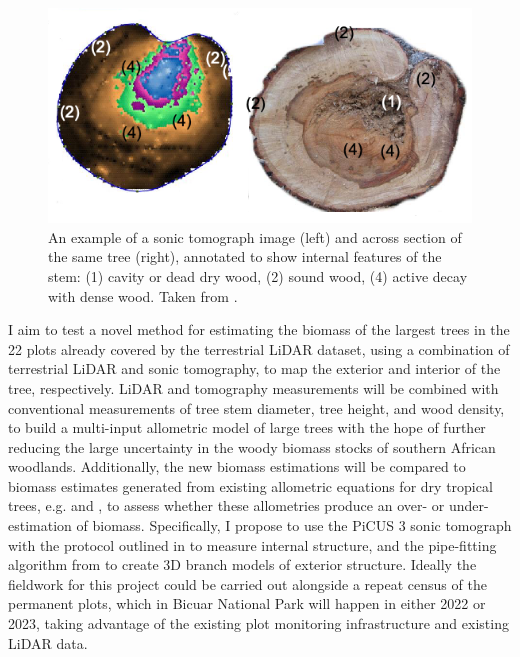 \begin{refsection}
\begin{figure}[!h]
\centering
	\includegraphics[width=\textwidth]{img/tomograph}
	\caption[Example tomograph visualisation and trunk cross-section photograph]{An example of a sonic tomograph image (left) and across section of
		the same tree (right), annotated to show internal features of the stem:
		(1) cavity or dead dry wood, (2) sound wood, (4) active decay with dense
	wood. Taken from \citet{Picus2016}.}
	\label{legacy:tomograph}
\end{figure}

I aim to test a novel method for estimating the biomass of the largest trees in the 22 plots already covered by the terrestrial LiDAR dataset, using a combination of terrestrial LiDAR and sonic tomography, to map the exterior and interior of the tree, respectively. LiDAR and tomography measurements will be combined with conventional measurements of tree stem diameter, tree height, and wood density, to build a multi-input allometric model of large trees with the hope of further reducing the large uncertainty in the woody biomass stocks of southern African woodlands. Additionally, the new biomass estimations will be compared to biomass estimates generated from existing allometric equations for dry tropical trees, e.g. \citet{Chave2014} and \citet{Ryan2011}, to assess whether these allometries produce an over- or under-estimation of biomass. Specifically, I propose to use the PiCUS 3 sonic tomograph with the protocol outlined in \citet{Gilbert2016} to measure internal structure, and the pipe-fitting algorithm from \citet{Calders2014} to create 3D branch models of exterior structure. Ideally the fieldwork for this project could be carried out alongside a repeat census of the permanent plots, which in Bicuar National Park will happen in either 2022 or 2023, taking advantage of the existing plot monitoring infrastructure and existing LiDAR data.


\end{refsection}
